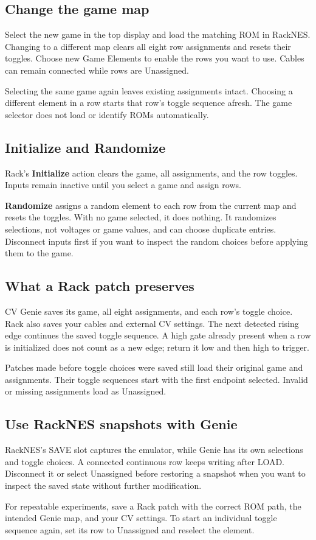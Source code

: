 \subsection{Change the game map}
Select the new game in the top display and load the matching ROM in RackNES.
Changing to a different map clears all eight row assignments and resets their
toggles. Choose new Game Elements to enable the rows you want to use. Cables
can remain connected while rows are Unassigned.

Selecting the same game again leaves existing assignments intact. Choosing
a different element in a row starts that row's toggle sequence afresh.
The game selector does not load or identify ROMs automatically.

\subsection{Initialize and Randomize}
Rack's \textbf{Initialize} action clears the game, all assignments, and the
row toggles. Inputs remain inactive until you select a game and assign rows.

\textbf{Randomize} assigns a random element to each row from the current
map and resets the toggles. With no game selected, it does nothing. It
randomizes selections, not voltages or game values, and can choose duplicate
entries. Disconnect inputs first if you want to inspect the random choices
before applying them to the game.

\subsection{What a Rack patch preserves}
CV Genie saves its game, all eight assignments, and each row's toggle choice.
Rack also saves your cables and external CV settings. The next detected
rising edge continues the saved toggle sequence. A high gate already present
when a row is initialized does not count as a new edge; return it low and
then high to trigger.

Patches made before toggle choices were saved still load their original
game and assignments. Their toggle sequences start with the first endpoint
selected.
Invalid or missing assignments load as Unassigned.

\subsection{Use RackNES snapshots with Genie}
RackNES's SAVE slot captures the emulator, while Genie has its own selections
and toggle choices. A connected continuous row keeps writing after LOAD.
Disconnect it or select Unassigned before restoring a snapshot when you
want to inspect the saved state without further modification.

For repeatable experiments, save a Rack patch with the correct ROM path,
the intended Genie map, and your CV settings. To start an individual toggle
sequence again, set its row to Unassigned and reselect the element.
